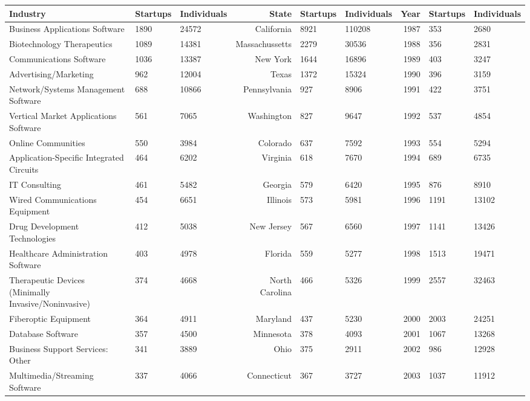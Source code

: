 \begin{table}[!htb]
\centering
\begingroup\scriptsize
\begin{tabular}{p{4.5cm}llrllrll}
  \toprule
Industry & Startups & Individuals & State & Startups & Individuals & Year & Startups & Individuals \\ 
  \midrule
Business Applications Software & 1890 & 24572 & California & 8921 & 110208 & 1987 & 353 & 2680 \\ 
  Biotechnology Therapeutics & 1089 & 14381 & Massachussetts & 2279 & 30536 & 1988 & 356 & 2831 \\ 
  Communications Software & 1036 & 13387 & New York & 1644 & 16896 & 1989 & 403 & 3247 \\ 
  Advertising/Marketing & 962 & 12004 & Texas & 1372 & 15324 & 1990 & 396 & 3159 \\ 
  Network/Systems Management Software & 688 & 10866 & Pennsylvania & 927 & 8906 & 1991 & 422 & 3751 \\ 
  Vertical Market Applications Software & 561 & 7065 & Washington & 827 & 9647 & 1992 & 537 & 4854 \\ 
  Online Communities & 550 & 3984 & Colorado & 637 & 7592 & 1993 & 554 & 5294 \\ 
  Application-Specific Integrated Circuits & 464 & 6202 & Virginia & 618 & 7670 & 1994 & 689 & 6735 \\ 
  IT Consulting & 461 & 5482 & Georgia & 579 & 6420 & 1995 & 876 & 8910 \\ 
  Wired Communications Equipment & 454 & 6651 & Illinois & 573 & 5981 & 1996 & 1191 & 13102 \\ 
  Drug Development Technologies & 412 & 5038 & New Jersey & 567 & 6560 & 1997 & 1141 & 13426 \\ 
  Healthcare Administration Software & 403 & 4978 & Florida & 559 & 5277 & 1998 & 1513 & 19471 \\ 
  Therapeutic Devices (Minimally Invasive/Noninvasive) & 374 & 4668 & North Carolina & 466 & 5326 & 1999 & 2557 & 32463 \\ 
  Fiberoptic Equipment & 364 & 4911 & Maryland & 437 & 5230 & 2000 & 2003 & 24251 \\ 
  Database Software & 357 & 4500 & Minnesota & 378 & 4093 & 2001 & 1067 & 13268 \\ 
  Business Support Services: Other & 341 & 3889 & Ohio & 375 & 2911 & 2002 & 986 & 12928 \\ 
  Multimedia/Streaming Software & 337 & 4066 & Connecticut & 367 & 3727 & 2003 & 1037 & 11912 \\ 

\end{tabular}
\end{table}
